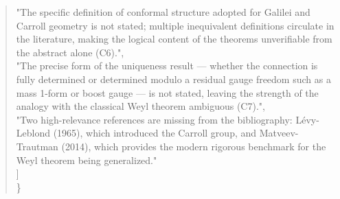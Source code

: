 \documentclass[11pt]{article}
\begin{document}
\begin{quote}
    "The specific definition of conformal structure adopted for Galilei and Carroll geometry is not stated; multiple inequivalent definitions circulate in the literature, making the logical content of the theorems unverifiable from the abstract alone (C6).",\\
    "The precise form of the uniqueness result — whether the connection is fully determined or determined modulo a residual gauge freedom such as a mass 1-form or boost gauge — is not stated, leaving the strength of the analogy with the classical Weyl theorem ambiguous (C7).",\\
    "Two high-relevance references are missing from the bibliography: Lévy-Leblond (1965), which introduced the Carroll group, and Matveev-Trautman (2014), which provides the modern rigorous benchmark for the Weyl theorem being generalized."\\
  ]\\
\}\\
\end{quote}
\end{document}
